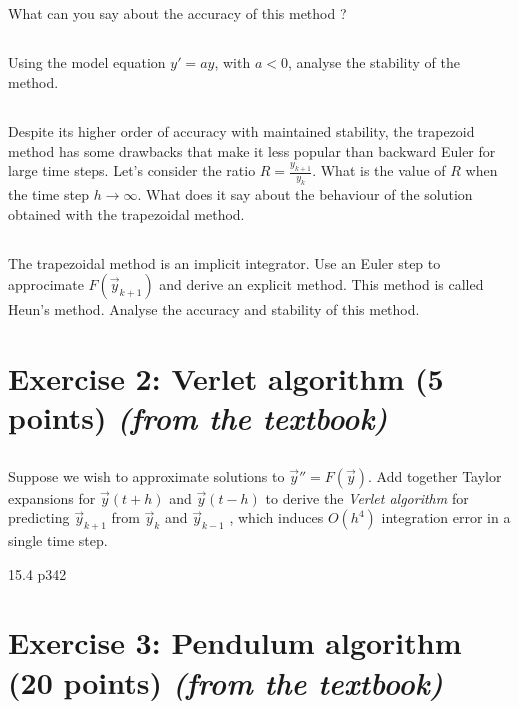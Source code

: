 \subsection{} What can you say about the accuracy of this method ?

\subsection{} Using the model equation $y' = ay$, with $a < 0$, analyse the stability of the method.

\subsection{} Despite its higher order of accuracy with maintained stability, the trapezoid method has some drawbacks that make it less popular than backward Euler for large time steps. Let's consider the ratio $R = \frac{y_{k+1}}{y_k}$. What is the value of $R$ when the time step $h \to \infty$. What does it say about the behaviour of the solution obtained with the trapezoidal method.

\subsection{} The trapezoidal method is an implicit integrator. Use an Euler step to approcimate $F(\vec{y}_{k+1})$ and derive an explicit method. This method is called Heun's method. Analyse the accuracy and stability of this method.

\section*{Exercise 2: Verlet algorithm \normalsize \textnormal(5 points) \textit{(from the textbook)}}

\subsection{} Suppose we wish to approximate solutions to $\vec{y}'' = F(\vec{y})$. Add together Taylor expansions for $\vec{y}(t + h)$ and $\vec{y}(t - h)$ to derive the \emph{Verlet algorithm} for predicting $\vec{y}_{k+1}$ from $\vec{y}_k$  and $\vec{y}_{k-1}$ , which induces $O(h^4)$ integration error in a single time step.

15.4 p342\\

\section*{Exercise 3: Pendulum algorithm \normalsize \textnormal(20 points) \textit{(from the textbook)}}

